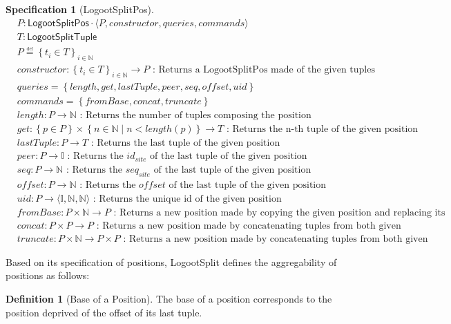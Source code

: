 \documentclass{article}
\newcommand{\commands}[1]{commands = \set{#1}}
\newcommand{\defeq}{\overset{\underset{\mathrm{def}}{}}{=}}
\newcommand{\fnspec}[3]{#1: #2 \text{ : #3}}
\newcommand{\inbb}[1]{\in \mathbb{#1}}
\newcommand{\mathlist}[2]{\set{#1_i \in #2}_{i \inbb{N}}}
\newcommand{\queries}[1]{queries = \set{#1}}
\newcommand{\set}[1]{\left\{#1\right\}} %
\newcommand{\spectuple}[1]{\tuple{#1, constructor, queries, commands}}
\newcommand{\ssep}{\mid} %
\newcommand{\tuple}[1]{\langle #1 \rangle}
\theoremstyle{definition}
\newtheorem{definition}{Definition}
\newtheorem{specification}{Specification}
\begin{document}
\begin{specification}[LogootSplitPos]
    \begin{align*}
    &P: \mathsf{LogootSplitPos} \cdot \spectuple{P}\\
    &T: \mathsf{LogootSplitTuple}\\
    &P \defeq \mathlist{t}{T}\\
    &\fnspec{constructor}{\mathlist{t}{T} \to P}{Returns a LogootSplitPos made of the given tuples}\\
    &\queries{length, get, lastTuple, peer, seq, offset, uid}\\
    &\commands{fromBase, concat, truncate}\\
    &\fnspec{length}{P \to \mathbb{N}}{Returns the number of tuples composing the position}\\
    &\fnspec{get}{\set{p \in P} \times \set{n \inbb{N} \ssep n < length(p)} \to T}{Returns the n-th tuple of the given position}\\
    &\fnspec{lastTuple}{P \to T}{Returns the last tuple of the given position}\\
    &\fnspec{peer}{P \to \mathbb{I}}{Returns the $id_{site}$ of the last tuple of the given position}\\
    &\fnspec{seq}{P \to \mathbb{N}}{Returns the $seq_{site}$ of the last tuple of the given position}\\
    &\fnspec{offset}{P \to \mathbb{N}}{Returns the $offset$ of the last tuple of the given position}\\
    &\fnspec{uid}{P \to \tuple{\mathbb{I}, \mathbb{N}, \mathbb{N}}}{Returns the unique id of the given position}\\
    &\fnspec{fromBase}{P \times \mathbb{N} \to P}{Returns a new position made by copying the given position and replacing its offset...}\\
    &\fnspec{concat}{P \times P \to P}{Returns a new position made by concatenating tuples from both given positions}\\
    &\fnspec{truncate}{P \times \mathbb{N} \to P \times P}{Returns a new position made by concatenating tuples from both given positions}
    \end{align*}
    \label{spec:logootsplit-pos}
\end{specification}

Based on its specification of positions, LogootSplit defines the aggregability of positions as follows:

\begin{definition}[Base of a Position]
    The base of a position corresponds to the position deprived of the offset of its last tuple.
\end{definition}
\end{document}
